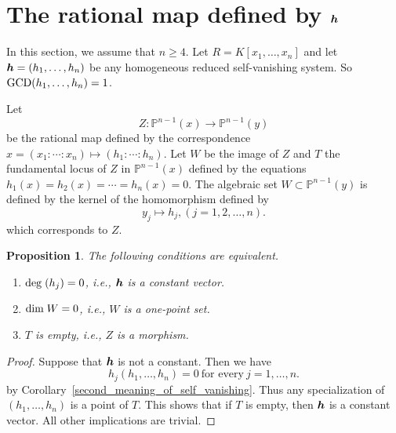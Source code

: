 \documentclass[12pt]{article}
\newtheorem{proposition}[theorem]{Proposition}
\theoremstyle{definition}
\theoremstyle{remark}
\def\dim{{\rm dim}}
\def\deg{{\rm deg}}
\def\boldh{\mbox{\boldmath $h$}}
\newcommand {\PP}{\mathbb{P}}
\begin{document}
\section{The rational map defined by $\boldh$ }
In this section, we assume that $n \geq 4$.  
Let $R=K[x_1, \ldots, x_n]$ 
and let $\boldh = (h_1, \ldots, h_n)$ be any homogeneous reduced self-vanishing system.
So ${\rm GCD}(h_1, \ldots, h_n) = 1$.

Let \[Z : \PP ^{n-1}(x) \rightarrow \PP^{n-1}(y)\]  
be the rational map defined by the correspondence $x=(x_1: \cdots : x_n) \mapsto (h_1 : \cdots : h_n)$.  
Let $W$ be the image of $Z$  and  $T$ the fundamental locus of $Z$ in $\PP^{n-1}(x)$ defined by 
the equations  $h_1(x)=h_2(x)= \cdots =h_n(x)=0$.
The algebraic set $W \subset \PP^{n-1}(y)$ is defined by the kernel of the homomorphism
defined by 
\[y_j \mapsto  h_j, (j=1, 2, \ldots, n).\] 
which corresponds to $Z$. 

\begin{proposition} \label{yamada's_corollary_2_page38}   %
The following conditions are equivalent.
\begin{enumerate}
\item[{\rm (a)}]
$\deg \; (h_j)=0$, i.e., $\boldh$ is a constant vector.

\item[{\rm (b)}]
$\dim \; W =0$, i.e., $W$ is a one-point set. 

\item[{\rm (c)}]
$T$ is empty, i.e., $Z$ is a morphism. 
\end{enumerate}
\end{proposition}

\begin{proof}
Suppose that $\boldh$  is not a constant.  Then we have  
\[h_j(h_1, \ldots, h_n)=0 \ \text{for every} \ j=1, \ldots, n.\] 
by Corollary~\ref{second_meaning_of_self_vanishing}.  
Thus any specialization of $(h_1, \ldots, h_n)$ is a point of $T$. 
This shows that if  $T$ is empty, then $\boldh$ is a constant vector.  All other implications are trivial.  
\end{proof}

\end{document}
